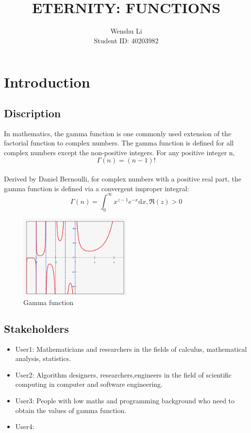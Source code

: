 \documentclass{report}
\begin{document}
\title{ETERNITY: FUNCTIONS}
\author{Wenshu Li\\Student ID: 40203982}
\date{}
\maketitle

\makeatletter
\let\thetitle\@title
\let\theauthor\@author
\let\thedate\@date
\makeatother





\tableofcontents
\newpage
\section{Introduction}
\subsection{Discription}
In mathematics, the gamma function is one commonly used extension of the factorial function to complex numbers. The gamma function is defined for all complex numbers except the non-positive integers. For any positive integer n, 
\\$$\Gamma \left ( n\right ) = \left ( n-1 \right )!$$ 
\\ Derived by Daniel Bernoulli, for complex numbers with a positive real part, the gamma function is defined via a convergent improper integral:
\\$$\Gamma \left ( n\right ) = \int_{0}^{\infty} x^{z-1} e^{-x}\mathrm{d}x,  \Re\left ( z \right )>0$$
\begin{figure}[h]
\caption{Gamma function}
\centering
\includegraphics[width=0.5\textwidth]{gamma}
\end{figure}
\subsection{Stakeholders}
\begin{itemize}
\item User1: Mathematicians and researchers in the fields of calculus, mathematical analysis, statistics.
\item User2: Algorithm designers, researchers,engineers in the field of scientific computing in computer and software engineering.
\item User3: People with low maths and programming background who need to obtain the values of gamma function.
\item User4: 
\end{itemize}
\end{document}
